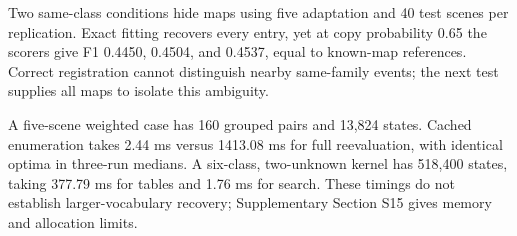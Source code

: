 Two same-class conditions hide maps using five adaptation and 40 test scenes per replication. Exact fitting recovers every entry, yet at copy probability 0.65 the scorers give F1 0.4450, 0.4504, and 0.4537, equal to known-map references. Correct registration cannot distinguish nearby same-family events; the next test supplies all maps to isolate this ambiguity.

A five-scene weighted case has 160 grouped pairs and 13,824 states. Cached enumeration takes 2.44 ms versus 1413.08 ms for full reevaluation, with identical optima in three-run medians. A six-class, two-unknown kernel has 518,400 states, taking 377.79 ms for tables and 1.76 ms for search. These timings do not establish larger-vocabulary recovery; Supplementary Section S15 gives memory and allocation limits.
